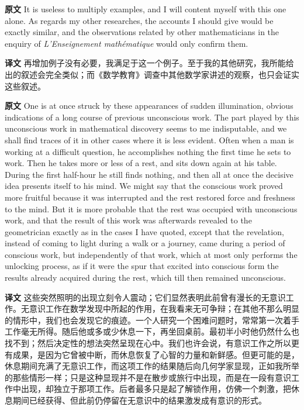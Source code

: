 \documentclass[UTF8,zihao=-4]{ctexart}
\newcommand{\BodyFont}{\fontsize{10.5pt}{15.5pt}\selectfont}
\newcommand{\origlabel}{\textbf{原文}\quad}
\newcommand{\translabel}{\textbf{译文}\quad}
\newenvironment{enblock}{\par\noindent\begingroup\BodyFont\origlabel}{\par\endgroup}
\newenvironment{zhblock}{\par\noindent\begingroup\BodyFont\translabel}{\par\endgroup\vspace{0.35em}}
\begin{document}
\begin{enblock}
It is useless to multiply examples, and I will content myself with this one alone. As regards my other researches, the accounts I should give would be exactly similar, and the observations related by other mathematicians in the enquiry of \emph{L'Enseignement mathématique} would only confirm them.
\end{enblock}
\begin{zhblock}
再增加例子没有必要，我满足于这一个例子。至于我的其他研究，我所能给出的叙述会完全类似；而《数学教育》调查中其他数学家讲述的观察，也只会证实这些叙述。\end{zhblock}

\begin{enblock}
One is at once struck by these appearances of sudden illumination, obvious indications of a long course of previous unconscious work. The part played by this unconscious work in mathematical discovery seems to me indisputable, and we shall find traces of it in other cases where it is less evident. Often when a man is working at a difficult question, he accomplishes nothing the first time he sets to work. Then he takes more or less of a rest, and sits down again at his table. During the first half-hour he still finds nothing, and then all at once the decisive idea presents itself to his mind. We might say that the conscious work proved more fruitful because it was interrupted and the rest restored force and freshness to the mind. But it is more probable that the rest was occupied with unconscious work, and that the result of this work was afterwards revealed to the geometrician exactly as in the cases I have quoted, except that the revelation, instead of coming to light during a walk or a journey, came during a period of conscious work, but independently of that work, which at most only performs the unlocking process, as if it were the spur that excited into conscious form the results already acquired during the rest, which till then remained unconscious.
\end{enblock}
\begin{zhblock}
这些突然照明的出现立刻令人震动；它们显然表明此前曾有漫长的无意识工作。无意识工作在数学发现中所起的作用，在我看来无可争辩；在其他不那么明显的情形中，我们也会发现它的痕迹。一个人研究一个困难问题时，常常第一次着手工作毫无所得。随后他或多或少休息一下，再坐回桌前。最初半小时他仍然什么也找不到；然后决定性的想法突然呈现在心中。我们也许会说，有意识工作之所以更有成果，是因为它曾被中断，而休息恢复了心智的力量和新鲜感。但更可能的是，休息期间充满了无意识工作，而这项工作的结果随后向几何学家显现，正如我所举的那些情形一样；只是这种显现并不是在散步或旅行中出现，而是在一段有意识工作中出现，却独立于那项工作。后者最多只是起了解锁作用，仿佛一个刺激，把休息期间已经获得、但此前仍停留在无意识中的结果激发成有意识的形式。\end{zhblock}
\end{document}
